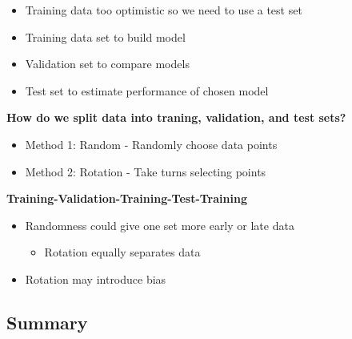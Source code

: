 \documentclass[
]{book}
\providecommand{\tightlist}{%
  \setlength{\itemsep}{0pt}\setlength{\parskip}{0pt}}
\begin{document}
\begin{itemize}
\tightlist
\item
  Training data too optimistic so we need to use a test set
\item
  Training data set to build model
\item
  Validation set to compare models
\item
  Test set to estimate performance of chosen model
\end{itemize}

\textbf{How do we split data into traning, validation, and test sets?}

\begin{itemize}
\tightlist
\item
  Method 1: Random - Randomly choose data points
\item
  Method 2: Rotation - Take turns selecting points
\end{itemize}

\textbf{Training-Validation-Training-Test-Training}

\begin{itemize}
\tightlist
\item
  Randomness could give one set more early or late data

  \begin{itemize}
  \tightlist
  \item
    Rotation equally separates data
  \end{itemize}
\item
  Rotation may introduce bias
\end{itemize}

\subsection{Summary}\label{summary-1}
\end{document}
